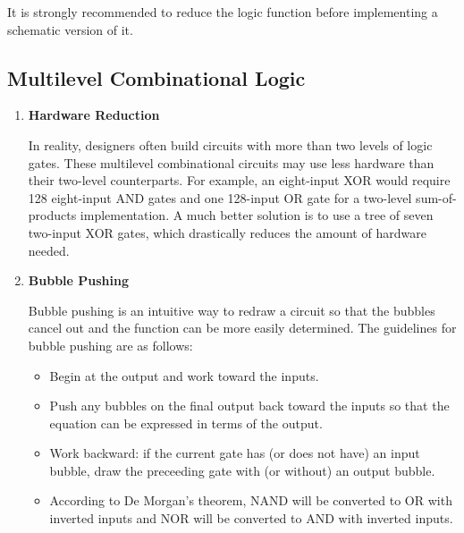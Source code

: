 \documentclass[12pt]{article}
\begin{document}
It is strongly recommended to reduce the logic function before implementing a schematic version of it.

\subsection{Multilevel Combinational Logic}

\begin{enumerate}
  \item \textbf{Hardware Reduction}

  In reality, designers often build circuits with more than two levels of logic gates. These multilevel combinational circuits may use less hardware than their two-level counterparts. For example, an eight-input XOR would require 128 eight-input AND gates and one 128-input OR gate for a two-level sum-of-products implementation. A much better solution is to use a tree of seven two-input XOR gates, which drastically reduces the amount of hardware needed.

  \item \textbf{Bubble Pushing}

  Bubble pushing is an intuitive way to redraw a circuit so that the bubbles cancel out and the function can be more easily determined. The guidelines for bubble pushing are as follows:

  \begin{itemize}
    \item Begin at the output and work toward the inputs.
    \item Push any bubbles on the final output back toward the inputs so that the equation can be expressed in terms of the output.
    \item Work backward: if the current gate has (or does not have) an input bubble, draw the preceeding gate with (or without) an output bubble.
    \item According to De Morgan's theorem, NAND will be converted to OR with inverted inputs and NOR will be converted to AND with inverted inputs.
  \end{itemize}
\end{enumerate}

\end{document}
